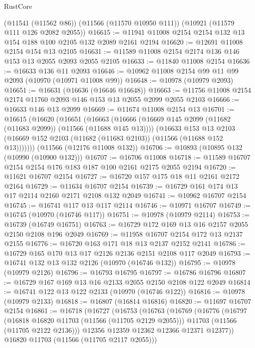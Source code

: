 \begin{lexlean}{RustCore}
\begin{coremodule}
    (@11541 (@11562 @86))
    (@11566 (@11570 @10950 @111))
    (@10921 (@11579 @111 @126 @2082 @2055))
@16615 := @11941 @11008 @2154 @2154 @132 @13 @154 @188 @100 @2105 @132 @2089 @2161 @2194
@16620 := @12691 @11008 @2154 @154 @13 @2105
@16631 := @11589 @11008 @2154 @2174 @136 @146 @153 @13 @2055 @2093 @2055 @2105
@16633 := @11840 @11008 @2154
@16636 := @16633 @136 @11 @2093
@16646 := @10962 @11008 @2154 @99 @11 @99 @2093 (@10970 (@10971 @11008 @99))
@16648 := @10978 (@10979 @2093)
@16651 := @16631 (@16636 (@16646 @16648))
@16663 := @11756 @11008 @2154 @2174 @11760 @2093 @146 @153 @13 @2055 @2099 @2055 @2103
@16666 := @16633 @146 @13 @2099
@16669 := @11674 @11008 @2154 @13
@16701 := @16615
    (@16620
      (@16651
        (@16663
          (@16666 (@16669 @145 @2099 (@11682 (@11683 @2099)) (@11566 (@11688 @145 @13))))
          (@16633
            @153
            @13
            @2103
            (@16669 @152 @2103 (@11682 (@11683 @2103)) (@11566 (@11688 @152 @13)))))))
    (@11566 (@12176 @11008 @132))
@16706 := @10893 (@10895 @132 (@10990 (@10900 @132)))
@16707 := @16706 @11008
@16718 := @11589 @16707 @2154 @2154 @176 @183 @187 @100 @2161 @2175 @2055 @2194
@16720 := @11621 @16707 @2154
@16727 := @16720 @157 @175 @18 @11 @2161 @2172 @2164
@16729 := @11634 @16707 @2154
@16739 := @16729 @161 @174 @13 @17 @2114 @2160 @2171 @2108 @132 @2049
@16741 := @10962 @16707 @2154
@16745 := @16741 @117 @13 @117 @2114
@16746 := @10971 @16707
@16749 := @16745 (@10970 (@16746 @117))
@16751 := @10978 (@10979 @2114)
@16753 := @16739 (@16749 @16751)
@16763 := @16729 @172 @169 @13 @16 @2157 @2055 @2150 @2108 @196 @2049
@16769 := @11958 @16707 @2154 @172 @13 @2137 @2155
@16776 := @16720 @163 @171 @18 @13 @2137 @2152 @2141
@16786 := @16729 @165 @170 @13 @17 @2126 @2136 @2151 @2108 @117 @2049
@16793 := @16741 @132 @13 @132 @2126 (@10970 (@16746 @132))
@16795 := @10978 (@10979 @2126)
@16796 := @16793 @16795
@16797 := @16786 @16796
@16807 := @16729 @167 @169 @13 @16 @2133 @2055 @2150 @2108 @122 @2049
@16814 := @16741 @122 @13 @122 @2133 (@10970 (@16746 @122))
@16816 := @10978 (@10979 @2133)
@16818 := @16807 (@16814 @16816)
@16820 := @11697 @16707 @2154
@16861 := @16718
    (@16727
      (@16753
        (@16763
          (@16769
            (@16776
              (@16797
                (@16818 @16820 @11703 (@11566 (@11705 @2129 @2055)))
                @11703
                (@11566 (@11705 @2122 @2136)))
              @12356
              @12359
              @12362
              @12366
              @12371
              @12377))
          @16820
          @11703
          (@11566 (@11705 @2117 @2055)))

\end{coremodule}
\end{lexlean}
